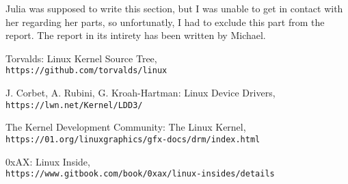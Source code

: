 \documentclass[a4paper,oneside,onecolumn]{article}
\begin{document}
Julia was supposed to write this section, but I was unable to get in contact with her regarding her parts, so unfortunatly, I had to exclude this part from the report. The report in its intirety has been written by Michael.

\begin{thebibliography}{9}
Torvalds: Linux Kernel Source Tree,
\\\texttt{https://github.com/torvalds/linux}

J. Corbet, A. Rubini, G. Kroah-Hartman: Linux Device Drivers,
\\\texttt{https://lwn.net/Kernel/LDD3/}

The Kernel Development Community: The Linux Kernel,
\\\texttt{https://01.org/linuxgraphics/gfx-docs/drm/index.html}

0xAX: Linux Inside,
\\\texttt{https://www.gitbook.com/book/0xax/linux-insides/details}
\end{thebibliography}
\end{document}
